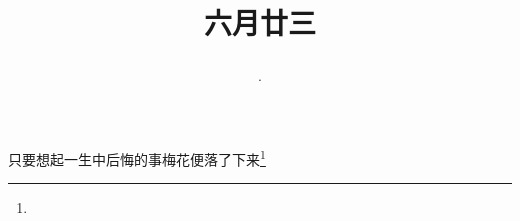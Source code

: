 \title{\date[d=28,m=7,y=2024][year:cn-y,年,month:cn,day:cn,日,·,weekday]·六月廿三 }
只要想起一生中后悔的事梅花便落了下来\footnote{ }


